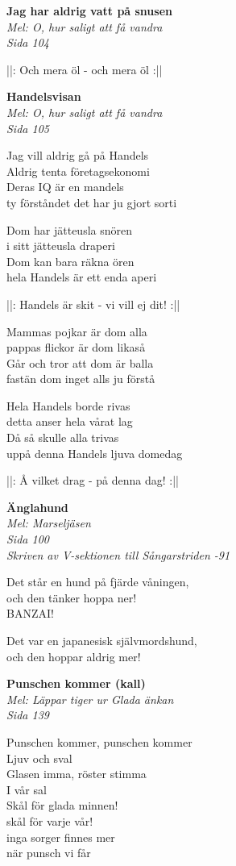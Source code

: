 \documentclass[10pt]{article}
\newenvironment{song}[2]{
	\textbf{#1}\\
	\emph{#2}\par
	\vspace{-1mm}
}{
	\vspace{2mm}
}
\begin{document}
\begin{multicols*}{2}
\begin{song}{Jag har aldrig vatt på snusen}{Mel: O, hur saligt att få vandra\\Sida 104}
	||: Och mera öl - och mera öl :||
\end{song}

\begin{song}{Handelsvisan}{Mel: O, hur saligt att få vandra\\Sida 105}
	Jag vill aldrig gå på Handels\\
	Aldrig tenta företagsekonomi\\
	Deras IQ är en mandels\\
	ty förståndet det har ju gjort sorti

	Dom har jätteusla snören\\
	i sitt jätteusla draperi\\
	Dom kan bara räkna ören\\
	hela Handels är ett enda aperi

	||: Handels är skit - vi vill ej dit! :||

	Mammas pojkar är dom alla\\
	pappas flickor är dom likaså\\
	Går och tror att dom är balla\\
	fastän dom inget alls ju förstå

	Hela Handels borde rivas \\
	detta anser hela vårat lag\\
	Då så skulle alla trivas\\
	uppå denna Handels ljuva domedag

	||: Å vilket drag - på denna dag! :||
\end{song}

\vfill
\columnbreak

\begin{song}{Änglahund}{Mel: Marseljäsen\\Sida 100\\Skriven av V-sektionen till Sångarstriden -91}
	Det står en hund på fjärde våningen,\\
	och den tänker hoppa ner!\\
	BANZAI!\par
	Det var en japanesisk självmordshund,\\
	och den hoppar aldrig mer!
\end{song}

\begin{song}{Punschen kommer (kall)}{Mel: Läppar tiger ur Glada änkan\\Sida 139}
	Punschen kommer, punschen kommer\\
	Ljuv och sval\\
	Glasen imma, röster stimma\\
	I vår sal\\
	Skål för glada minnen!\\
	skål för varje vår!\\
	inga sorger finnes mer\\
	när punsch vi får
\end{song}


\end{multicols*}
\end{document}
